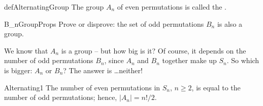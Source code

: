 \begin{defn}{defAlternatingGroup}
The group $A_n$\label{alternatinggroup} of even permutations is called the . 
\end{defn}

\begin{exercise}{B_nGroupProps}
Prove or disprove: the set of odd permutations $B_n$ is also a group.
\end{exercise}

% 
% 
% 
 
We know that $A_n$ is a group -- but how big is it? Of course, it depends on the number of odd permutations $B_n$, since $A_n$ and $B_n$ together make up $S_n$.
So which is bigger: $A_n$ or $B_n$? The answer is \ldots neither!

\begin{prop}{Alternating1}
The number of even permutations in $S_n$, $n \geq 2$, is equal to the
number of odd permutations; hence, $| A_n | = n!/2$.
\end{prop}
 
